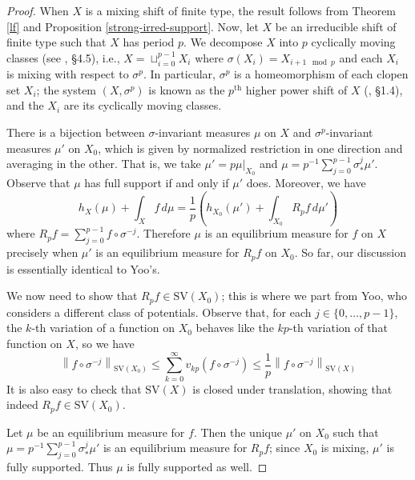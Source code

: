 \documentclass{amsproc}
\numberwithin{theorem}{section}
\theoremstyle{remark}
\theoremstyle{definition}
\newcommand{\SV}{\mathrm{SV}}
\newcommand\SVnorm[2]{\left\lVert#1\right\rVert_{\mathrm{SV}(#2)}}
\theoremstyle{plain}
\begin{document}
\begin{proof}
When $X$ is a mixing shift of finite type, the result follows from Theorem \ref{lf} and Proposition \ref{strong-irred-support}. Now, let $X$ be an irreducible shift of finite type such that $X$ has period $p$. We decompose $X$ into $p$ cyclically moving classes (see \cite{lind1995introduction}, \S 4.5), i.e., $X = \sqcup_{i=0}^{p-1} X_i$ where $\sigma(X_i) = X_{i+1 \mod p}$ and each $X_i$ is mixing with respect to $\sigma^p$. In particular, $\sigma^p$ is a homeomorphism of each clopen set $X_i$; the system $(X, \sigma^p)$ is known as the $p^{\text{th}}$ higher power shift of $X$ (\cite{lind1995introduction}, \S 1.4), and the $X_i$ are its cyclically moving classes. 

There is a bijection between $\sigma$-invariant measures $\mu$ on $X$ and $\sigma^p$-invariant measures $\mu'$ on $X_0$, which is given by normalized restriction in one direction and averaging in the other. That is, we take $\mu' = p \mu|_{X_0}$ and $\mu = p^{-1 }\sum_{j=0}^{p-1} \sigma^{j}_* \mu'$. Observe that $\mu$ has full support if and only if $\mu'$ does. 
Moreover, we have
\[\label{eq-pressure-mixing-comp}
h_X(\mu) + \int_X f \, d\mu = \frac{1}{p} \left( h_{X_0}(\mu') + \int_{X_0} R_p f \, d\mu'         \right)
\]
where $R_p f =  \sum_{j=0}^{p-1} f \circ \sigma^{-j}$. Therefore $\mu$ is an equilibrium measure for $f$ on $X$ precisely when $\mu'$ is an equilibrium measure for $R_p f$ on $X_0$. So far, our discussion is essentially identical to Yoo's.


We now need to show that $R_p f \in \SV(X_0)$; this is where we part from Yoo, who considers a different class of potentials.  Observe that, for each $j \in \{0, \dots, p-1\}$, the $k$-th variation of a function on $X_0$ behaves like the $kp$-th variation of that function on $X$, so we have
\[
\SVnorm{f \circ \sigma^{-j}}{X_0} \leq \sum_{k=0}^{\infty} v_{kp}(f \circ \sigma^{-j}) \leq \frac{1}{p} \SVnorm{f \circ \sigma^{-j}}{X}
\]
It is also easy to check that $\SV(X)$ is closed under translation, showing that indeed $R_p f \in \SV(X_0)$. 

Let $\mu$  be an equilibrium measure for $f$. Then the unique $\mu'$ on $X_0$ such that $\mu = p^{-1 }\sum_{j=0}^{p-1} \sigma^{j}_* \mu'$ is an equilibrium measure for $R_p f$; since $X_0$ is mixing, $\mu'$ is fully supported. Thus $\mu$ is fully supported as well.
\end{proof}
\end{document}
